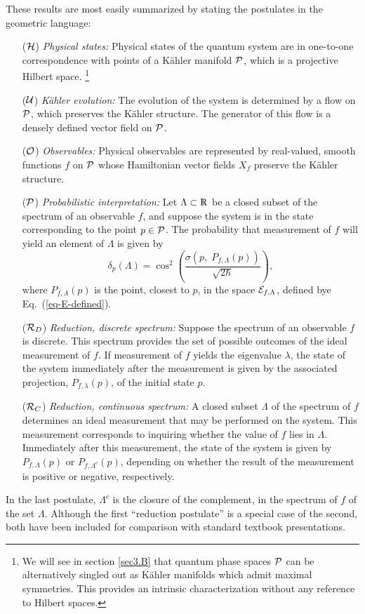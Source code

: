 \documentclass[12pt,aps,eqsecnum,tighten]{revtex4-2}
\def\P{{\cal P}}
\newcommand{\eqn}[1]{Eq.~(\ref{#1})}
\def\Bbb{}
\def\Rl{{\mathchoice 
{\setbox0=\hbox{$\displaystyle\rm R$}\hbox{\hbox to0pt
{\kern0.4\wd0\vrule height0.9\ht0\hss}\box0}}
{\setbox0=\hbox{$\textstyle\rm R$}\hbox{\hbox to0pt
{\kern0.4\wd0\vrule height0.9\ht0\hss}\box0}}
{\setbox0=\hbox{$\scriptstyle\rm R$}\hbox{\hbox to0pt
{\kern0.4\wd0\vrule height0.9\ht0\hss}\box0}}
{\setbox0=\hbox{$\scriptscriptstyle\rm R$}\hbox{\hbox to0pt
{\kern0.4\wd0\vrule height0.9\ht0\hss}\box0}}}}
\def\Rl{{\mathchoice
{\setbox0=\hbox{$\displaystyle\rm R$}\hbox{\hbox to0pt
{\kern0.4\wd0\vrule height0.9\ht0\hss}\box0}}
{\setbox0=\hbox{$\textstyle\rm R$}\hbox{\hbox to0pt
{\kern0.4\wd0\vrule height0.9\ht0\hss}\box0}}
{\setbox0=\hbox{$\scriptstyle\rm R$}\hbox{\hbox to0pt
{\kern0.4\wd0\vrule height0.9\ht0\hss}\box0}}
{\setbox0=\hbox{$\scriptscriptstyle\rm R$}\hbox{\hbox to0pt
{\kern0.4\wd0\vrule height0.9\ht0\hss}\box0}}}}
\def\R{\Rl}
\begin{document}
These results are most easily summarized by stating the postulates in
the geometric language:
%
\begin{itemize}
\item[(${\cal H}$)] {\it Physical states: } Physical states of the
quantum system are in one-to-one correspondence with points of a
K\"ahler manifold ${\cal P}$, which is a projective Hilbert space.%
%
\footnote{We will see in section \ref{sec3.B} that quantum phase
spaces $\P$ can be alternatively singled out as K\"ahler manifolds
which admit maximal symmetries.  This provides an intrinsic
characterization without any reference to Hilbert spaces.}
%
\item[(${\cal U}$)] {\it K\"ahler evolution: } The evolution of the
system is determined by a flow on $\P$, which preserves the K\"ahler
structure. The generator of this flow is a densely defined vector
field on $\P$.
%
\item[(${\cal O}$)] {\it Observables: } Physical observables are
represented by real-valued, smooth functions $f$ on $\P$ whose
Hamiltonian vector fields $X_f$ preserve the K\"ahler structure.
%
\item[(${\cal P}$)] {\it Probabilistic interpretation: } Let $\Lambda
\subset \R$ be a closed subset of the spectrum of an observable $f$,
and suppose the system is in the state corresponding to the point $p
\in \P$.  The probability that measurement of $f$ will yield an
element of $\Lambda$ is given by
%
\begin{equation}
\delta_p(\Lambda) = \cos^2\left(\frac {\sigma(p, \;{\Bbb P}_{f,\Lambda}
(p))} {\sqrt{2\hbar}} \right),
\end{equation}
%	
where ${\Bbb P}_{f,\Lambda}(p)$ is the point, closest to $p$, in the
space ${\cal E}_{f, \Lambda}$, defined bye \eqn{eq-E-defined}.
%
\item[(${\cal R}_D$)] {\it Reduction, discrete spectrum: } Suppose the
spectrum of an observable $f$ is discrete.  This spectrum provides the
set of possible outcomes of the ideal measurement of $f$.  If
measurement of $f$ yields the eigenvalue $\lambda$, the state of the
system immediately after the measurement is given by the associated
projection, ${\Bbb P}_{f,\lambda}(p)$, of the initial state $p$.
%
\item[(${\cal R}_C$)] {\it Reduction, continuous spectrum: } A closed
subset $\Lambda$ of the spectrum of $f$ determines an ideal
measurement that may be performed on the system.  This measurement
corresponds to inquiring whether the value of $f$ lies in $\Lambda$.
Immediately after this measurement, the state of the system is given
by ${\Bbb P}_{f,\Lambda}(p)$ or ${\Bbb P}_{f,\Lambda^c}(p)$, depending
on whether the result of the measurement is positive or negative,
respectively.
\end{itemize}
%
In the last postulate, $\Lambda^c$ is the closure of the complement,
in the spectrum of $f$ of the set $\Lambda$.  Although the first
``reduction postulate''  is a special case of the second, both have
been included for comparison with standard textbook presentations.
\end{document}
